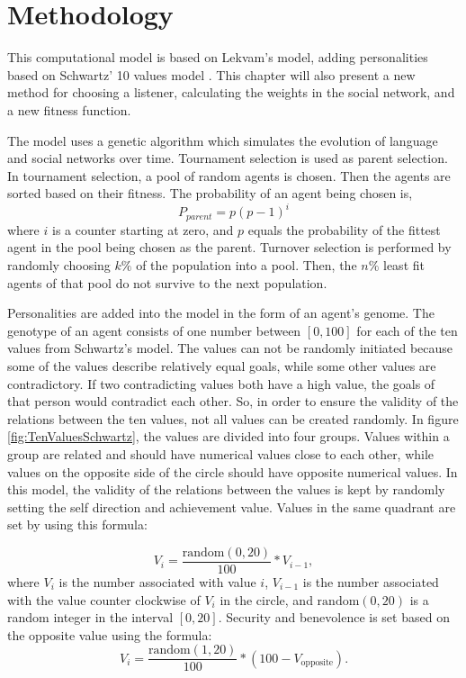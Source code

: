 \acresetall
\chapter{Methodology}\label{ch:Methodology}

This computational model is based on Lekvam’s model, adding personalities based on Schwartz' 10 values model \citep{lekvam2014co, schwartz2012overview}. This chapter will also present a new method for choosing a listener, calculating the weights in the social network, and a new fitness function.

The model uses a genetic algorithm which simulates the evolution of language and social networks over time. Tournament selection is used as parent selection. In tournament selection, a pool of random agents is chosen. Then the agents are sorted based on their fitness. The probability of an agent being chosen is,
\begin{equation}
    \label{eq:TSelect}
    P_{parent} = p(p-1)^{i}
\end{equation}
where $i$ is a counter starting at zero, and $p$ equals the probability of the fittest agent in the pool being chosen as the parent. Turnover selection is performed by randomly choosing $k\%$ of the population into a pool. Then, the $n\%$ least fit agents of that pool do not survive to the next population. 

Personalities are added into the model in the form of an agent’s genome. The genotype of an agent consists of one number between $[0, 100]$ for each of the ten values from Schwartz’s model. The values can not be randomly initiated because some of the values describe relatively equal goals, while some other values are contradictory. If two contradicting values both have a high value, the goals of that person would contradict each other. So, in order to ensure the validity of the relations between the ten values, not all values can be created randomly. In figure \ref{fig:TenValuesSchwartz}, the values are divided into four groups. Values within a group are related and should have numerical values close to each other, while values on the opposite side of the circle should have opposite numerical values. In this model, the validity of the relations between the values is kept by randomly setting the self direction and achievement value. Values in the same quadrant are set by using this formula:

\begin{equation}\label{eq:valuesInSameQuadrant}
V_{i} = \frac{\mathrm{random}(0, 20)}{100} \ast V_{i-1},
\end{equation}
where $V_{i}$ is the number associated with value $i$, $V_{i-1}$ is the number associated with the value counter clockwise of $V_i$ in the circle, and $\mathrm{random}(0, 20)$ is a random integer in the interval $[0, 20]$. Security and benevolence is set based on the opposite value using the formula:
\begin{equation}\label{eq:valuesInOppositeQuadrant}
V_{i} = \frac{\mathrm{random}(1, 20)}{100} \ast (100 - V_{\mathrm{opposite}}).
\end{equation}

